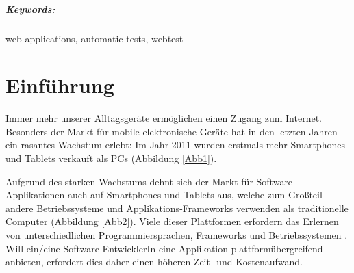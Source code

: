 \documentclass[a4paper,bibtotoc,oneside]{scrbook}
\begin{document}
\vfill
\paragraph*{Keywords:} web applications, automatic tests, webtest
\newpage


\tableofcontents\thispagestyle{empty}
\newpage

\setcounter{page}{1}

\chapter{Einführung}
Immer mehr unserer Alltagsgeräte ermöglichen einen Zugang zum Internet. Besonders der Markt für mobile elektronische Geräte hat in den letzten Jahren ein rasantes Wachstum erlebt: Im Jahr 2011 wurden erstmals mehr Smartphones und Tablets verkauft als PCs (Abbildung \ref{Abb1}).

Aufgrund des starken Wachstums dehnt sich der Markt für Software-Applikationen auch auf Smartphones und Tablets aus, welche zum Großteil andere Betriebssysteme und Applikations-Frameworks verwenden als traditionelle Computer (Abbildung \ref{Abb2}). Viele dieser Plattformen erfordern das Erlernen von unterschiedlichen Programmiersprachen, Frameworks und Betriebssystemen \cite{android}\cite{ios}. Will ein/eine Software-EntwicklerIn eine Applikation plattformübergreifend anbieten, erfordert dies daher einen höheren Zeit- und Kostenaufwand.
\end{document}
